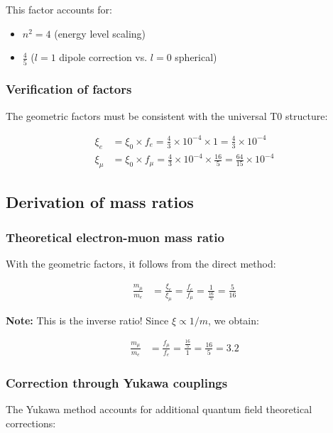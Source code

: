 This factor accounts for:
\begin{itemize}
	\item $n^2 = 4$ (energy level scaling)
	\item $\frac{4}{5}$ ($l=1$ dipole correction vs. $l=0$ spherical)
\end{itemize}

\subsubsection{Verification of factors}

The geometric factors must be consistent with the universal T0 structure:

\begin{align}
	\xi_e &= \xi_0 \times f_e = \frac{4}{3} \times 10^{-4} \times 1 = \frac{4}{3} \times 10^{-4}\\
	\xi_\mu &= \xi_0 \times f_\mu = \frac{4}{3} \times 10^{-4} \times \frac{16}{5} = \frac{64}{15} \times 10^{-4}
\end{align}

\subsection{Derivation of mass ratios}

\subsubsection{Theoretical electron-muon mass ratio}

With the geometric factors, it follows from the direct method:

\begin{align}
	\frac{m_\mu}{m_e} &= \frac{\xi_e}{\xi_\mu} = \frac{f_e}{f_\mu} = \frac{1}{\frac{16}{5}} = \frac{5}{16}
\end{align}

\textbf{Note:} This is the inverse ratio! Since $\xi \propto 1/m$, we obtain:

\begin{align}
	\frac{m_\mu}{m_e} &= \frac{f_\mu}{f_e} = \frac{\frac{16}{5}}{1} = \frac{16}{5} = 3.2
\end{align}

\subsubsection{Correction through Yukawa couplings}

The Yukawa method accounts for additional quantum field theoretical corrections:

